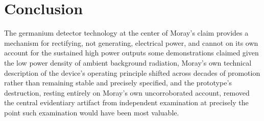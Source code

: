\documentclass[11pt]{article}
\begin{document}
\section{Conclusion}

The germanium detector technology at the center of Moray's claim provides a mechanism for rectifying, not generating, electrical power, and cannot on its own account for the sustained high power outputs some demonstrations claimed given the low power density of ambient background radiation, Moray's own technical description of the device's operating principle shifted across decades of promotion rather than remaining stable and precisely specified, and the prototype's destruction, resting entirely on Moray's own uncorroborated account, removed the central evidentiary artifact from independent examination at precisely the point such examination would have been most valuable.
\end{document}
